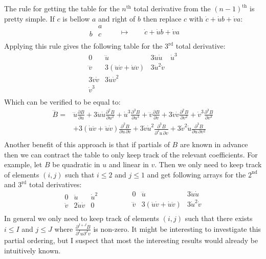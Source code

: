 The rule for getting the table for the $n^\text{th}$ total derivative from the $(n-1)^\text{th}$ is pretty simple.
If $c$ is bellow $a$ and right of $b$ then replace $c$ with $\dot{c}+\dot{u}b+\dot{v}a$:
\[
	\begin{matrix}
		&a\\
		b&c\\
	\end{matrix}
	\quad\quad
	\mapsto
	\quad\quad
	\dot{c}+\dot{u}b+\dot{v}a
\]
Applying this rule gives the following table for the $3^\text{rd}$ total derivative:
\[\begin{matrix}
	0&\dddot{u}&3\ddot{u}\dot{u}&\dot{u}^3\\
	\dddot{v}&3(\ddot{u}\dot{v}+\dot{u}\ddot{v})&3\dot{u}^2\dot{v}\\
	3\ddot{v}\dot{v}&3\dot{u}\dot{v}^2\\
	\dot{v}^3\\
\end{matrix}\]
Which can be verified to be equal to:
\[\begin{aligned}
	\dddot{B} =& \dddot{u}\frac{\partial B}{\partial u} + 3\ddot{u}\dot{u}\frac{\partial^2 B}{\partial u^2} + \dot{u}^3\frac{\partial^3 B}{\partial u^3}
	+\dddot{v}\frac{\partial B}{\partial v} + 3\ddot{v}\dot{v}\frac{\partial^2 B}{\partial v^2} + \dot{v}^3\frac{\partial^3 B}{\partial v^3}\\
	&+3(\dot{u}\ddot{v}+\ddot{u}\dot{v})\frac{\partial^2 B}{\partial u\,\partial v}
	+3\dot{v}\dot{u}^2\frac{\partial^3 B}{\partial^2u\,\partial v} +3\dot{v}^2\dot{u}\frac{\partial^3 B}{\partial u\,\partial v^2}\\
\end{aligned}\]
Another benefit of this approach is that if partials of $B$ are known in advance then we can contract the table to only keep track of the relevant coefficients.
For example,
let $B$ be quadratic in $u$ and linear in $v$.
Then we only need to keep track of elements $(i,j)$ such that $i\leq2$ and $j\leq1$ and get following arrays for the $2^\text{nd}$ and $3^\text{rd}$ total derivatives:
\[
\begin{matrix}
	0&\ddot{u}&\dot{u}^2\\
	\ddot{v}&2\dot{u}\dot{v}&0\\
\end{matrix}
\quad\quad\quad\quad
\begin{matrix}
	0&\dddot{u}&3\ddot{u}\dot{u}\\
	\dddot{v}&3(\ddot{u}\dot{v}+\dot{u}\ddot{v})&3\dot{u}^2\dot{v}\\
\end{matrix}
\]
In general we only need to keep track of elements $(i,j)$ such that there exists $i\leq I$ and $j\leq J$ where $\frac{\partial^{I+J} B}{\partial^I u\partial^J v}$ is non-zero.
It might be interesting to investigate this partial ordering,
but I suspect that most the interesting results would already be intuitively known.

